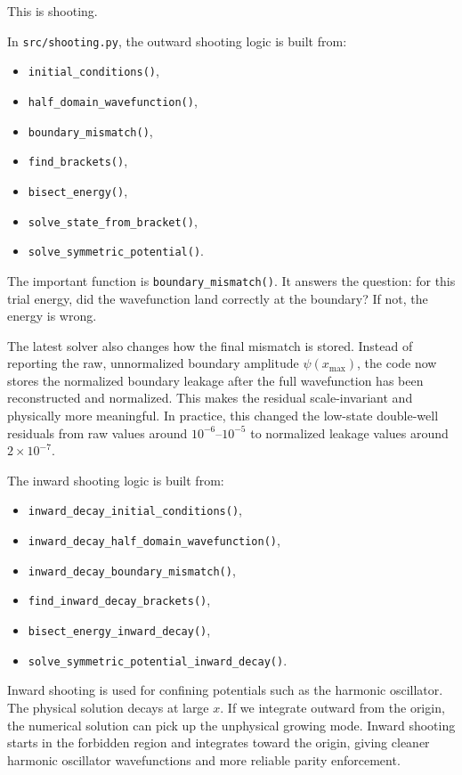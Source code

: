 \documentclass[11pt]{article}
\begin{document}
    This is shooting.

    In \texttt{src/shooting.py}, the outward shooting logic is built from:
    \begin{itemize}
        \item \texttt{initial\_conditions()},
        \item \texttt{half\_domain\_wavefunction()},
        \item \texttt{boundary\_mismatch()},
        \item \texttt{find\_brackets()},
        \item \texttt{bisect\_energy()},
        \item \texttt{solve\_state\_from\_bracket()},
        \item \texttt{solve\_symmetric\_potential()}.
    \end{itemize}

    The important function is \texttt{boundary\_mismatch()}. It answers the question: for this trial energy, did the wavefunction land correctly at the boundary? If not, the energy is wrong.

    The latest solver also changes how the final mismatch is stored. Instead of reporting the raw, unnormalized boundary amplitude $\psi(x_{\max})$, the code now stores the normalized boundary leakage after the full wavefunction has been reconstructed and normalized. This makes the residual scale-invariant and physically more meaningful. In practice, this changed the low-state double-well residuals from raw values around $10^{-6}$--$10^{-5}$ to normalized leakage values around $2\times10^{-7}$.

    The inward shooting logic is built from:
    \begin{itemize}
        \item \texttt{inward\_decay\_initial\_conditions()},
        \item \texttt{inward\_decay\_half\_domain\_wavefunction()},
        \item \texttt{inward\_decay\_boundary\_mismatch()},
        \item \texttt{find\_inward\_decay\_brackets()},
        \item \texttt{bisect\_energy\_inward\_decay()},
        \item \texttt{solve\_symmetric\_potential\_inward\_decay()}.
    \end{itemize}

    Inward shooting is used for confining potentials such as the harmonic oscillator. The physical solution decays at large $x$. If we integrate outward from the origin, the numerical solution can pick up the unphysical growing mode. Inward shooting starts in the forbidden region and integrates toward the origin, giving cleaner harmonic oscillator wavefunctions and more reliable parity enforcement.
\end{document}
